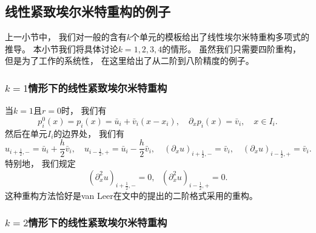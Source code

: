 \subsection{线性紧致埃尔米特重构的例子}

上一小节中，
我们对一般的含有$k$个单元的模板给出了线性埃尔米特重构多项式的推导。
本小节我们将具体讨论$k=1,2,3,4$的情形。
虽然我们只需要四阶重构，
但是为了工作的系统性，
在这里给出了从二阶到八阶精度的例子。

\subsubsection{$k=1$情形下的线性紧致埃尔米特重构}

当$k=1$且$r=0$时，
我们有
\begin{equation}
  \label{eq:1D-HC2}
  p^0_{i}(x) =p_{i}(x) = \bar u_{i} + \bar v_{i}(x-x_{i}), \quad
  {\partial_x}p_{i}(x)=\bar v_{i}, \quad
  x\in I_{i}.
\end{equation}
然后在单元$I_{i}$的边界处，
我们有
\begin{equation}
  u_{i+\frac 12,-} = \bar u_{i} + \frac{h}{2}\bar v_{i}, \quad
  u_{i-\frac 12,+} = \bar u_{i} - \frac{h}{2}\bar v_{i}, \quad
  ({\partial_x} u)_{i+\frac 12,-} = \bar v_{i}, \quad
  ({\partial_x} u)_{i-\frac 12,+} = \bar v_{i}.
\end{equation}
特别地，
我们规定
\begin{equation}
  ({\partial_x^2} u)_{i+\frac 12,-} = 0, \ \ \
  ({\partial_x^2} u)_{i-\frac 12,+} = 0.
\end{equation}
这种重构方法恰好是van Leer在文\cite{van-Leer}中的提出的二阶格式采用的重构。

\subsubsection{$k=2$情形下的线性紧致埃尔米特重构}

